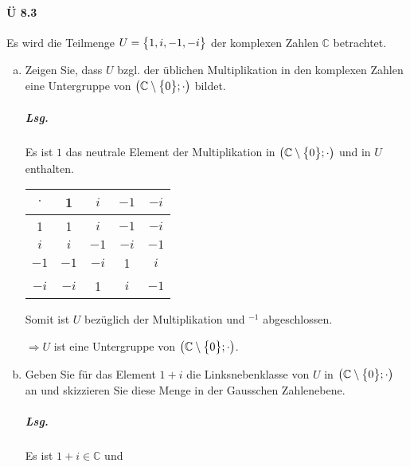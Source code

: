 \documentclass{scrreprt}
\begin{document}
\paragraph{Ü 8.3} Es wird die Teilmenge $U = \qty\big{1, i, -1, -i}$ der
komplexen Zahlen $\mathbb{C}$ betrachtet.
\begin{enumerate}[(a)]
\item Zeigen Sie, dass $U$ bzgl. der üblichen Multiplikation in den komplexen
  Zahlen eine Untergruppe von $\qty\big(\mathbb{C} \setminus \qty\big{0}; \cdot)$
  bildet.

  \subparagraph{Lsg.} Es ist $1$ das neutrale Element der Multiplikation in
  $\qty\big(\mathbb{C} \setminus \qty\big{0}; \cdot)$ und in $U$ enthalten.

  \begin{tabular}{|c|cccc|}
    \hline
    $\cdot$ & 1    & $i$  & $-1$ & $-i$ \\
    \hline
    1       & 1    & $i$  & $-1$ & $-i$ \\
    $i$     & $i$  & $-1$ & $-i$ & $-1$ \\
    $-1$    & $-1$ & $-i$ & 1    & $i$  \\
    $-i$    & $-i$ & 1    & $i$  & $-1$ \\
    \hline
  \end{tabular}

  Somit ist $U$ bezüglich der Multiplikation und $^{-1}$ abgeschlossen.

  $\Rightarrow U$ ist eine Untergruppe von
  $\qty\big(\mathbb{C} \setminus \qty\big{0}; \cdot)$.

\item Geben Sie für das Element $1 + i$ die Linksnebenklasse von $U$ in
  $\qty\big(\mathbb{C} \setminus \qty\big{0}; \cdot)$ an und skizzieren Sie diese
  Menge in der Gausschen Zahlenebene.

  \subparagraph{Lsg.} Es ist $1 + i \in \mathbb{C}$ und


\end{enumerate}
\end{document}
